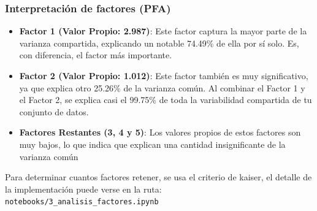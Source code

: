 \documentclass[journal]{IEEEtran}
\begin{document}
	\subsubsection{Interpretación de factores (PFA)}
	\begin{itemize}
		\item \textbf{Factor 1 (Valor Propio: 2.987)}: Este factor captura la mayor parte de la varianza compartida, explicando un notable 74.49\% de ella por sí solo. Es, con diferencia, el factor más importante.
		\item \textbf{Factor 2 (Valor Propio: 1.012)}: Este factor también es muy significativo, ya que explica otro 25.26\% de la varianza común. Al combinar el Factor 1 y el Factor 2, se explica casi el 99.75\% de toda la variabilidad compartida de tu conjunto de datos.
		\item \textbf{Factores Restantes (3, 4 y 5)}: Los valores propios de estos factores son muy bajos, lo que indica que explican una cantidad insignificante de la varianza común
	\end{itemize}
	Para determinar cuantos factores retener, se usa el criterio de kaiser, el detalle de la implementación puede verse en la ruta: \texttt{notebooks/3\_analisis\_factores.ipynb}
\end{document}

